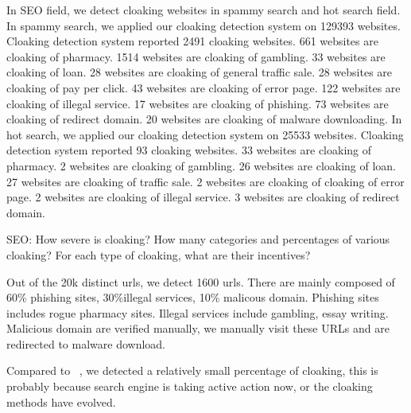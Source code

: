 In SEO field, we detect cloaking websites in spammy search and hot search field. In spammy search,
we applied our cloaking detection system on 129393 websites. Cloaking detection system reported 2491
cloaking websites. 661 websites are cloaking of pharmacy. 1514 websites are cloaking of gambling.
33 websites are cloaking of loan. 28 websites are cloaking of general traffic sale. 28 websites are cloaking
of pay per click. 43 websites are cloaking of error page. 122 websites are cloaking of illegal service. 
17 websites are cloaking of phishing. 73 websites are cloaking of redirect domain. 20 websites are cloaking of malware downloading.
In hot search, we applied our cloaking detection system on 25533 websites. Cloaking detection system reported 93
cloaking websites. 33 websites are cloaking of pharmacy. 2 websites are cloaking of gambling.
26 websites are cloaking of loan. 27 websites are cloaking of traffic sale. 2 websites are cloaking of cloaking of
error page. 2 websites are cloaking of illegal service. 3 websites are cloaking of redirect domain. 

SEO: How severe is cloaking? How many categories and percentages of various
cloaking? For each type of cloaking, what are their incentives?

Out of the 20k distinct urls, we detect 1600 urls. There are mainly composed of
60\% phishing sites, 30\%illegal services, 10\% malicous domain. Phishing sites includes rogue
pharmacy sites. Illegal services include gambling, essay writing. Malicious
domain are verified manually, we manually visit these URLs and are redirected to
malware download.

Compared to  ~\cite{wang2011cloak}, we detected a relatively small percentage of
cloaking, this is probably because search engine is taking active action now, or
the cloaking methods have evolved.

%
%
%







